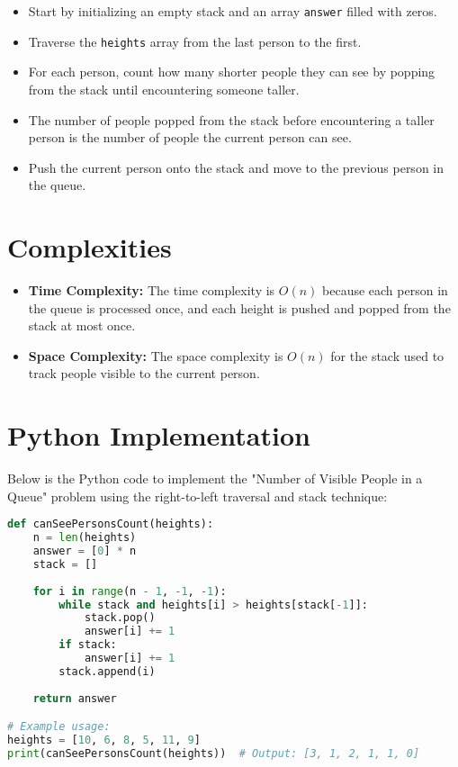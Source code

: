 \begin{itemize}
    \item Start by initializing an empty stack and an array \texttt{answer} filled with zeros.
    \item Traverse the \texttt{heights} array from the last person to the first.
    \item For each person, count how many shorter people they can see by popping from the stack until encountering someone taller.
    \item The number of people popped from the stack before encountering a taller person is the number of people the current person can see.
    \item Push the current person onto the stack and move to the previous person in the queue.
\end{itemize}

\section*{Complexities}

\begin{itemize}
    \item \textbf{Time Complexity:} The time complexity is \(O(n)\) because each person in the queue is processed once, and each height is pushed and popped from the stack at most once.
    \item \textbf{Space Complexity:} The space complexity is \(O(n)\) for the stack used to track people visible to the current person.
\end{itemize}

\section*{Python Implementation}

Below is the Python code to implement the "Number of Visible People in a Queue" problem using the right-to-left traversal and stack technique:

\begin{fullwidth}
\begin{lstlisting}[language=Python]
def canSeePersonsCount(heights):
    n = len(heights)
    answer = [0] * n
    stack = []
    
    for i in range(n - 1, -1, -1):
        while stack and heights[i] > heights[stack[-1]]:
            stack.pop()
            answer[i] += 1
        if stack:
            answer[i] += 1
        stack.append(i)
    
    return answer

# Example usage:
heights = [10, 6, 8, 5, 11, 9]
print(canSeePersonsCount(heights))  # Output: [3, 1, 2, 1, 1, 0]
\end{lstlisting}

\end{fullwidth}

